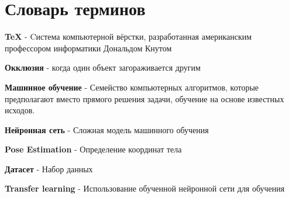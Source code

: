 \chapter*{Словарь терминов}             %

\textbf{TeX} - Cистема компьютерной вёрстки, разработанная американским профессором информатики Дональдом Кнутом

\textbf{Окклюзия} - когда один объект загораживается другим

\textbf{Машинное обучение} - Семейство компьютерных алгоритмов, которые предполагают вместо прямого решения задачи, обучение на основе известных исходов.


\textbf{Нейронная сеть} - Сложная модель машинного обучения

\textbf{Pose Estimation} - Определение координат тела

\textbf{Датасет} - Набор данных

\textbf{Transfer learning} - Использование обученной нейронной сети для обучения 
